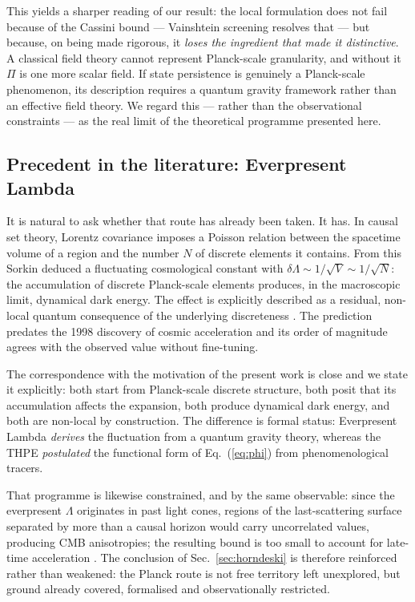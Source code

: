 \documentclass[aps,prd,twocolumn,superscriptaddress,nofootinbib,floatfix]{revtex4-2}
\begin{document}
This yields a sharper reading of our result: the local formulation does
not fail because of the Cassini bound --- Vainshtein screening resolves
that --- but because, on being made rigorous, it \emph{loses the
ingredient that made it distinctive}. A classical field theory cannot
represent Planck-scale granularity, and without it $\Pi$ is one more
scalar field. If state persistence is genuinely a Planck-scale
phenomenon, its description requires a quantum gravity framework rather
than an effective field theory. We regard this --- rather than the
observational constraints --- as the real limit of the theoretical
programme presented here.

\subsection{Precedent in the literature: Everpresent Lambda}
\label{sec:everpresent}

It is natural to ask whether that route has already been taken. It has.
In causal set theory, Lorentz covariance imposes a Poisson relation
between the spacetime volume of a region and the number $N$ of discrete
elements it contains. From this Sorkin \cite{Sorkin1991,Sorkin2000}
deduced a fluctuating cosmological constant with
$\delta\Lambda\sim1/\sqrt{V}\sim1/\sqrt{N}$: the accumulation of
discrete Planck-scale elements produces, in the macroscopic limit,
dynamical dark energy. The effect is explicitly described as a residual,
non-local quantum consequence of the underlying discreteness
\cite{Ahmed2004,Ahmed2013}. The prediction predates the 1998 discovery
of cosmic acceleration and its order of magnitude agrees with the
observed value without fine-tuning.

The correspondence with the motivation of the present work is close and
we state it explicitly: both start from Planck-scale discrete structure,
both posit that its accumulation affects the expansion, both produce
dynamical dark energy, and both are non-local by construction. The
difference is formal status: Everpresent Lambda \emph{derives} the
fluctuation from a quantum gravity theory, whereas the THPE
\emph{postulated} the functional form of Eq.~(\ref{eq:phi}) from
phenomenological tracers.

That programme is likewise constrained, and by the same observable:
since the everpresent $\Lambda$ originates in past light cones, regions
of the last-scattering surface separated by more than a causal horizon
would carry uncorrelated values, producing CMB anisotropies; the
resulting bound is too small to account for late-time acceleration
\cite{Barrow2007}. The conclusion of Sec.~\ref{sec:horndeski} is
therefore reinforced rather than weakened: the Planck route is not free
territory left unexplored, but ground already covered, formalised and
observationally restricted.
\end{document}
